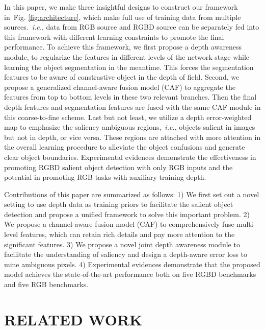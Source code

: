 \documentclass[sigconf]{acmart}
\def\ie{{\em i.e.}}
\newcommand{\figref}[1]{Fig. \ref{#1}}
\begin{document}
In this paper, we make three insightful designs to construct our framework in~\figref{fig:architecture}, which make full use of training data from multiple sources.~\ie, data from RGB source and RGBD source can be separately fed into this framework with different learning constraints to promote the final performance.
To achieve this framework, we first propose a depth awareness module, to regularize the features in different levels of the network stage while learning the object segmentation in the meantime. This forces the segmentation features to be aware of constrastive object in the depth of field. 
Second, we propose a generalized channel-aware fusion model (CAF) to aggregate the features from top to bottom levels in these two relevant branches. Then the final depth features and segmentation features are fused with the same CAF module in this coarse-to-fine scheme. Last but not least, we utilize a depth error-weighted map to emphasize the saliency ambiguous regions,~\ie, objects salient in images but not in depth, or vice versa. These regions are attached with more attention in the overall learning procedure to alleviate the object confusions and generate clear object boundaries. Experimental evidences demonstrate the effectiveness in promoting RGBD salient object detection with only RGB inputs and the potential in promoting RGB tasks with auxiliary training depth.

Contributions of this paper are summarized as follows: 1) We first set out a novel setting to use depth data as training priors to facilitate the salient object detection and propose a unified framework to solve this important problem. 2) We propose a channel-aware fusion model (CAF) to comprehensively fuse multi-level features, which can retain rich details and pay more attention to the significant features. 3) We propose a novel joint depth awareness module to facilitate the understanding of saliency and design a depth-aware error loss to mine ambiguous pixels. 4) Experimental evidences demonstrate that the proposed model achieves the state-of-the-art performance both on five RGBD benchmarks and five RGB benchmarks. 






\section{RELATED WORK}
\end{document}
